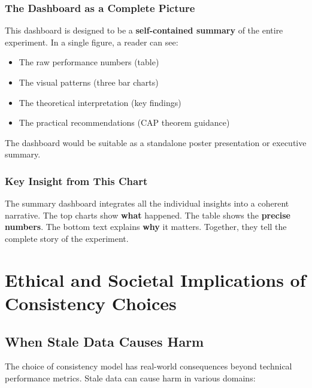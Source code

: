\documentclass[10pt,a4paper]{article}
\begin{document}
\subsubsection{The Dashboard as a Complete Picture}

This dashboard is designed to be a \textbf{self-contained summary} of the entire experiment. In a single figure, a reader can see:
\begin{itemize}
    \item The raw performance numbers (table)
    \item The visual patterns (three bar charts)
    \item The theoretical interpretation (key findings)
    \item The practical recommendations (CAP theorem guidance)
\end{itemize}

The dashboard would be suitable as a standalone poster presentation or executive summary.

\subsubsection{Key Insight from This Chart}

The summary dashboard integrates all the individual insights into a coherent narrative. The top charts show \textbf{what} happened. The table shows the \textbf{precise numbers}. The bottom text explains \textbf{why} it matters. Together, they tell the complete story of the experiment.

\newpage

\section{Ethical and Societal Implications of Consistency Choices}

\subsection{When Stale Data Causes Harm}

The choice of consistency model has real-world consequences beyond technical performance metrics. Stale data can cause harm in various domains:
\end{document}
